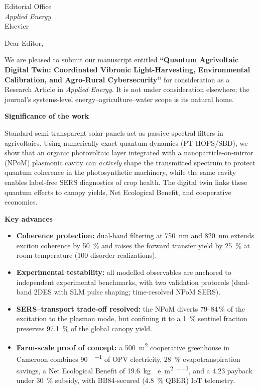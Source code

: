 \documentclass[10pt]{letter}
\begin{document}
\sloppy

\begin{letter}{Editorial Office\\
\textit{Applied Energy}\\
Elsevier}

\opening{Dear Editor,}

We are pleased to submit our manuscript entitled \textbf{``Quantum Agrivoltaic Digital Twin: Coordinated Vibronic Light-Harvesting, Environmental Calibration, and Agro-Rural Cybersecurity''} for consideration as a Research Article in \textit{Applied Energy}. It is not under consideration elsewhere; the journal's systems-level energy--agriculture--water scope is its natural home.

\noindent\textbf{Significance of the work}

Standard semi-transparent solar panels act as passive spectral filters in agrivoltaics. Using numerically exact quantum dynamics (PT-HOPS/SBD), we show that an organic photovoltaic layer integrated with a nanoparticle-on-mirror (NPoM) plasmonic cavity can \emph{actively} shape the transmitted spectrum to protect quantum coherence in the photosynthetic machinery, while the same cavity enables label-free SERS diagnostics of crop health. The digital twin links these quantum effects to canopy yields, Net Ecological Benefit, and cooperative economics.

\noindent\textbf{Key advances}

\begin{itemize}
\item \textbf{Coherence protection:} dual-band filtering at \qty{750}{\nm} and \qty{820}{\nm} extends exciton coherence by \qty{50}{\percent} and raises the forward transfer yield by \qty{25}{\percent} at room temperature (100 disorder realizations).
\item \textbf{Experimental testability:} all modelled observables are anchored to independent experimental benchmarks, with two validation protocols (dual-band 2DES with SLM pulse shaping; time-resolved NPoM SERS).
\item \textbf{SERS--transport trade-off resolved:} the NPoM diverts 79--84\,\% of the excitation to the plasmon mode, but confining it to a \qty{1}{\percent} sentinel fraction preserves \qty{97.1}{\percent} of the global canopy yield.
\item \textbf{Farm-scale proof of concept:} a \qty{500}{\m\squared} cooperative greenhouse in Cameroon combines \qty{90}{\MWh\per\yr} of OPV electricity, \qty{28}{\percent} evapotranspiration savings, a Net Ecological Benefit of \qty{19.6}{\kg{}e\per\m\squared\per\yr}, and a \qty{4.23}{\yr} payback under \qty{30}{\percent} subsidy, with BB84-secured (\qty{4.8}{\percent} QBER) IoT telemetry.
\end{itemize}


\end{letter}
\end{document}
